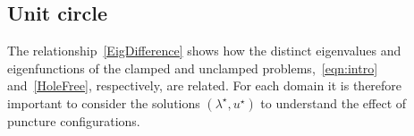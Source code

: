 \documentclass[times]{article}
\newcommand{\xx}{\mathbf{x}}
\begin{document}

\subsection{Unit circle}
The relationship~\eqref{EigDifference} shows how the distinct
eigenvalues and eigenfunctions of the clamped and unclamped
problems,~\eqref{eqn:intro} and~\eqref{HoleFree}, respectively, are
related. For each domain it is therefore important to consider the
solutions $(\lambda^{\star},u^{\star})$ to understand the effect of
puncture configurations.
\end{document}
